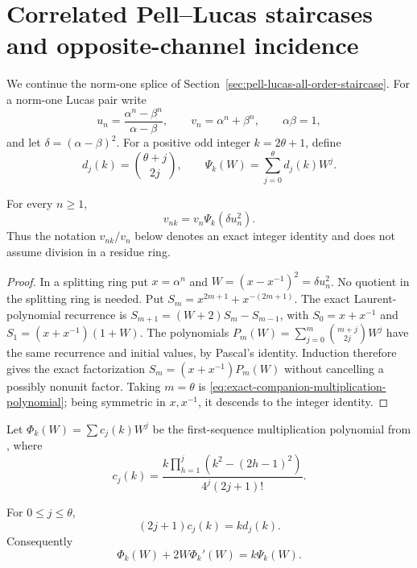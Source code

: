\section{Correlated Pell--Lucas staircases and opposite-channel incidence}
\label{sec:pell-lucas-correlated-all-order}

We continue the norm-one splice of
Section~\ref{sec:pell-lucas-all-order-staircase}.  For a norm-one Lucas pair
write
\[
 u_n=\frac{\alpha^n-\beta^n}{\alpha-\beta},
 \qquad v_n=\alpha^n+\beta^n,
 \qquad \alpha\beta=1,
\]
and let $\delta=(\alpha-\beta)^2$.  For a positive odd integer
$k=2\theta+1$, define
\begin{equation}\label{eq:companion-polynomial-coefficients}
 d_j(k)=\binom{\theta+j}{2j},
 \qquad
 \Psi_k(W)=\sum_{j=0}^{\theta}d_j(k)W^j.
\end{equation}

\begin{proposition}
\label{prop:exact-companion-multiplication-polynomial}
For every $n\ge1$,
\begin{equation}\label{eq:exact-companion-multiplication-polynomial}
 v_{nk}=v_n\Psi_k(\delta u_n^2).
\end{equation}
Thus the notation $v_{nk}/v_n$ below denotes an exact integer identity and
does not assume division in a residue ring.
\end{proposition}

\begin{proof}
In a splitting ring put $x=\alpha^n$ and
$W=(x-x^{-1})^2=\delta u_n^2$.  No quotient in the splitting ring is
needed.  Put $S_m=x^{2m+1}+x^{-(2m+1)}$.  The exact Laurent-polynomial
recurrence is $S_{m+1}=(W+2)S_m-S_{m-1}$, with
$S_0=x+x^{-1}$ and $S_1=(x+x^{-1})(1+W)$.  The polynomials
$P_m(W)=\sum_{j=0}^m\binom{m+j}{2j}W^j$ have the same recurrence and
initial values, by Pascal's identity.  Induction therefore gives the exact
factorization $S_m=(x+x^{-1})P_m(W)$ without cancelling a possibly nonunit
factor.  Taking $m=\theta$ is
\eqref{eq:exact-companion-multiplication-polynomial}; being symmetric in
$x,x^{-1}$, it descends to the integer identity.
\end{proof}

Let $\Phi_k(W)=\sum c_j(k)W^j$ be the first-sequence multiplication
polynomial from \cite[Proposition~5.1]{ZhangLucas2026}, where
\[
 c_j(k)=\frac{k\prod_{h=1}^j(k^2-(2h-1)^2)}
              {4^j(2j+1)!}.
\]

\begin{theorem}
\label{thm:pell-lucas-coefficient-correlation}
For $0\le j\le\theta$,
\begin{equation}\label{eq:pell-lucas-coefficient-correlation}
             (2j+1)c_j(k)=k d_j(k).
\end{equation}
Consequently
\begin{equation}\label{eq:pell-lucas-differential-polynomials}
                 \Phi_k(W)+2W\Phi_k'(W)=k\Psi_k(W).
\end{equation}
\end{theorem}

